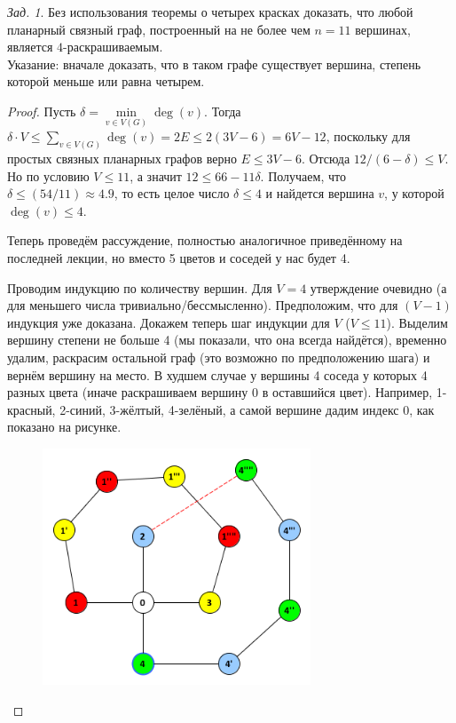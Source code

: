 \documentclass[a4paper,12pt]{article}
\numberwithin{figure}{section}
\theoremstyle{remark}
\newtheorem{problem}{Зад.}[section]
\begin{document}
\begin{problem}
	Без использования теоремы о четырех красках доказать, что любой планарный связный граф, построенный на не более чем $n=11$ вершинах, является $4$-раскрашиваемым. \\
	Указание: вначале доказать, что в таком графе существует вершина, степень которой меньше или равна четырем.
\end{problem}
\begin{proof}
	
	Пусть $\delta = \min \limits_{v \in V(G)} \deg(v)$.
	Тогда $\delta \cdot V \leqslant \sum \limits_{v \in V(G)} {\deg(v)}
	      = 2E \leqslant 2(3V-6) = 6V-12$,
	поскольку для простых связных планарных графов верно $E \leqslant 3V-6$.
	Отсюда $ 12 / (6 - \delta) \leqslant V$.
	Но по условию $V \leqslant 11$, а значит $12 \leqslant 66 - 11 \delta$.
	Получаем, что $\delta \leqslant (54 / 11) \approx 4.9$,
	то есть целое число $\delta \leqslant 4$
	и найдется вершина $v$, у которой $\deg(v) \leqslant 4$.
	
	Теперь проведём рассуждение, полностью аналогичное приведённому на последней лекции, но вместо 5 цветов и соседей у нас будет 4.
	
	Проводим индукцию по количеству вершин. Для $V=4$ утверждение очевидно (а для меньшего числа тривиально/бессмысленно). Предположим, что для $(V-1)$ индукция уже доказана. Докажем теперь шаг индукции для $V$ ($V \leqslant 11$). Выделим вершину степени не больше 4 (мы показали, что она всегда найдётся), временно удалим, раскрасим остальной граф (это возможно по предположению шага) и вернём вершину на место. В худшем случае у вершины 4 соседа у которых 4 разных цвета (иначе раскрашиваем вершину 0 в оставшийся цвет). Например, 1-красный, 2-синий, 3-жёлтый, 4-зелёный, а самой вершине дадим индекс 0, как показано на рисунке.
	
	\begin{figure}[H]
		\centering
		\includegraphics[width=8cm]{stepik-lesson12347-step8-problem.png}
	\end{figure}


\end{proof}
\end{document}
